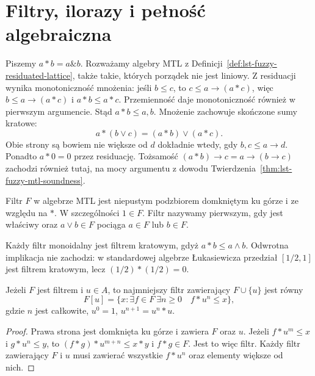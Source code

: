 \section{Filtry, ilorazy i pełność algebraiczna}
Piszemy $a*b=a\mathbin{\&}b$. Rozważamy algebry MTL z
Definicji~\ref{def:lst-fuzzy-residuated-lattice}, także takie,
których porządek nie jest liniowy. Z residuacji wynika monotoniczność
mnożenia: jeśli $b\leq c$, to $c\leq a\to(a*c)$, więc
$b\leq a\to(a*c)$ i $a*b\leq a*c$. Przemienność daje
monotoniczność również w pierwszym argumencie. Stąd $a*b\leq a,b$.
Mnożenie zachowuje skończone sumy kratowe:
\[
 a*(b\vee c)=(a*b)\vee(a*c).
\]
Obie strony są bowiem nie większe od $d$ dokładnie wtedy, gdy
$b,c\leq a\to d$. Ponadto $a*0=0$ przez residuację.
Tożsamość $(a*b)\to c=a\to(b\to c)$ zachodzi również tutaj,
na mocy argumentu z dowodu Twierdzenia~\ref{thm:lst-fuzzy-mtl-soundness}.

\begin{definicja}\label{def:lst-fuzzy-filter}
Filtr $F$ w algebrze MTL jest niepustym podzbiorem domkniętym
ku górze i ze względu na $*$. W szczególności $1\in F$.
Filtr nazywamy pierwszym, gdy jest właściwy oraz
$a\vee b\in F$ pociąga $a\in F$ lub $b\in F$.
\end{definicja}
Każdy filtr monoidalny jest filtrem kratowym, gdyż
$a*b\leq a\wedge b$. Odwrotna implikacja nie zachodzi:
w standardowej algebrze Łukasiewicza przedział $[1/2,1]$
jest filtrem kratowym, lecz $(1/2)*(1/2)=0$.

\begin{lemat}
\label{lem:lst-fuzzy-generated-filter}
Jeżeli $F$ jest filtrem i $u\in A$, to najmniejszy filtr
zawierający $F\cup\{u\}$ jest równy
\[
 F[u]=\{x:\exists f\in F\ \exists n\geq0\quad f*u^n\leq x\},
\]
gdzie $n$ jest całkowite, $u^0=1$, $u^{n+1}=u^n*u$.
\end{lemat}
\begin{proof}
Prawa strona jest domknięta ku górze i zawiera $F$ oraz $u$.
Jeżeli $f*u^m\leq x$ i $g*u^n\leq y$, to
$(f*g)*u^{m+n}\leq x*y$ i $f*g\in F$.
Jest to więc filtr. Każdy filtr zawierający $F$ i $u$ musi
zawierać wszystkie $f*u^n$ oraz elementy większe od nich.
\end{proof}

